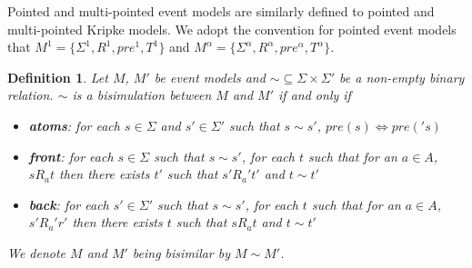 \documentclass[12pt, a4paper, titlepage]{scrartcl}
\newtheorem{defn}{Definition}
\begin{document}
Pointed and multi-pointed event models are similarly defined to pointed and multi-pointed Kripke
models.
We adopt the convention for pointed event models that $M^1 = \{\Sigma^1, R^1,
pre^1, T^1\}$ and $M^\alpha = \{\Sigma^\alpha,R^\alpha,pre^\alpha,T^\alpha\}$.

\begin{defn} \label{bisim}
	Let $M$, $M'$ be event models and $\sim \subseteq \Sigma \times \Sigma'$ be a non-empty binary
	relation.
	$\sim$ is a bisimulation between $M$ and $M'$ if and only if
	\begin{itemize}
		\item {\bf atoms}: for each $s \in \Sigma$ and $s' \in \Sigma'$ such that $s \sim s'$, $pre(s)
		\iff pre('s)$
		\item {\bf front}: for each $s \in \Sigma$ such that $s \sim s'$, for each $t$ such that for an
		$a \in A$, $s R_a t$ then there exists $t'$ such that $s' R_a' t'$ and $t \sim t'$
		\item {\bf back}: for each $s' \in \Sigma'$ such that $s \sim s'$, for each $t$ such that for an
		$a \in A$, $s' R_a' r'$ then there exists $t$ such that $s R_a t$ and $t \sim t'$
	\end{itemize}
	We denote $M$ and $M'$ being bisimilar by $M \sim M'$.
\end{defn}
\end{document}
